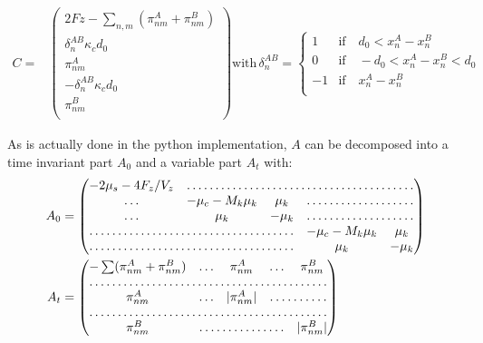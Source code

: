\documentclass[a4paper,12pt]{article}
\begin{document}
\begin{equation}
\begin{aligned}
    C = &%
    \begin{pmatrix}
      2Fz - \sum_{n,m}(\pi_{nm}^A + \pi_{nm}^B) \\
      \delta_n^{AB} \kappa_c d_0\\
      \pi_{nm}^A\\
      -\delta_n^{AB} \kappa_c d_0\\
      \pi_{nm}^B\\
    \end{pmatrix}
    \mathrm{with}\, \delta_n^{AB} =%
    \begin{cases}
      1  &\mathrm{if}\quad d_0 < x_n^A - x_n^B\\
      0  &\mathrm{if}\quad - d_0 < x_n^A - x_n^B < d_0\\
      -1 &\mathrm{if}\quad  x_n^A - x_n^B\\
    \end{cases}
\end{aligned}
\end{equation}

As is actually done in the python implementation, 
$A$  can be decomposed into a time invariant part $A_0$ and a
variable part $A_t$ with:\\
\begin{equation}
  \begin{aligned}
    A_0 &=%
    \begin{pmatrix}
      - 2 \mu_s - 4 F_z/V_z & \hdotsfor{4}\\
      \hdots &  -\mu_c - M_k \mu_k& \mu_k & \hdotsfor{2}\\
      \hdots & \mu_k & - \mu_k & \hdotsfor{2}\\
      \hdotsfor{3} & -\mu_c - M_k \mu_k & \mu_k\\
      \hdotsfor{3} & \mu_k & - \mu_k\\
    \end{pmatrix}\\
    A_t &=%
    \begin{pmatrix}
      - \sum (\pi_{nm}^A + \pi_{nm}^B)& \hdots & \pi_{nm}^A &%
      \hdots &  \pi_{nm}^B\\
      \hdotsfor{5}\\
      \pi_{nm}^A & \hdots & |\pi_{nm}^A| & \hdotsfor{2}\\
      \hdotsfor{5}\\
      \pi_{nm}^B & \hdotsfor{3} & |\pi_{nm}^B| \\
    \end{pmatrix}\\
  \end{aligned}
\end{equation}
\end{document}
